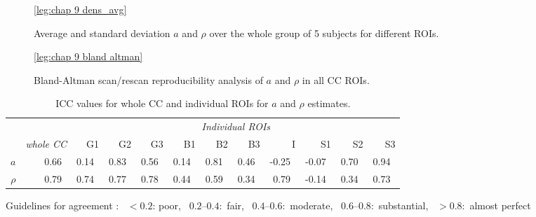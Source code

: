 \begin{figure}[ht]
	\centering
	\ref{leg:chap 9 dens_avg}\\	
	\caption{Average and standard deviation $a$ and $\rho$ over the whole group of 5 subjects for different \gls{ROI}s.}
	\label{fig:chap9 scan rescan averages}
\end{figure}

\begin{figure}[ht]
	\centering
	\ref{leg:chap 9 bland altman}	
	\caption{Bland-Altman scan/rescan reproducibility analysis of $a$ and $\rho$ in all \gls{CC} \gls{ROI}s.}
	\label{fig:chap9 bland altman plot}	
\end{figure}	



\begin{table}[ht]
\caption{ICC values for whole \gls{CC} and individual \gls{ROI}s for $a$ and $\rho$ estimates.}
\label{tab:chapter9 ICC table}
\begin{adjustbox}{width={\textwidth},totalheight=\textheight,keepaspectratio}
\begin{tabular}{rrrrrrrrrrrr}
      \toprule
       & & \multicolumn{10}{c}{\textit{Individual \gls{ROI}s}}                                             \\
       & \textit{whole \gls{CC}} & G1    & G2    & G3    & B1    & B2    & B3    & I     & S1    & S2    & S3\\
       \cmidrule(rl){2-2} \cmidrule(l){3-12}
       \addlinespace
$a$    & 0.66~\usebox{\substantialBox} & 0.14~\usebox{\poorBox}  & 0.83~\usebox{\perfectBox} & 0.56~\usebox{\moderateBox}  & 0.14~\usebox{\poorBox}  & 0.81~\usebox{\perfectBox}  & 0.46~\usebox{\moderateBox}  & -0.25~\usebox{\poorBox} & -0.07~\usebox{\poorBox} & 0.70~\usebox{\substantialBox}  & 0.94~\usebox{\perfectBox}  \\
$\rho$ & 0.79~\usebox{\substantialBox} & 0.74~\usebox{\substantialBox}  & 0.77~\usebox{\substantialBox}  & 0.78~\usebox{\substantialBox}  & 0.44~\usebox{\moderateBox}  & 0.59~\usebox{\moderateBox}  & 0.34~\usebox{\fairBox}  & 0.79~\usebox{\substantialBox}  & -0.14~\usebox{\poorBox} & 0.34~\usebox{\fairBox}  & 0.73~\usebox{\substantialBox}  \\
\bottomrule
\end{tabular}
\end{adjustbox}
{\footnotesize Guidelines for agreement  \citep{Landis:1977}: \usebox{\poorBox}~$<0.2$: poor,  \usebox{\fairBox}~$0.2–0.4$:~fair,  \usebox{\moderateBox}~$0.4–0.6$:~moderate, \usebox{\substantialBox}~$0.6–0.8$:~substantial,  \usebox{\perfectBox}~$>0.8$:~almost perfect}
\end{table}

